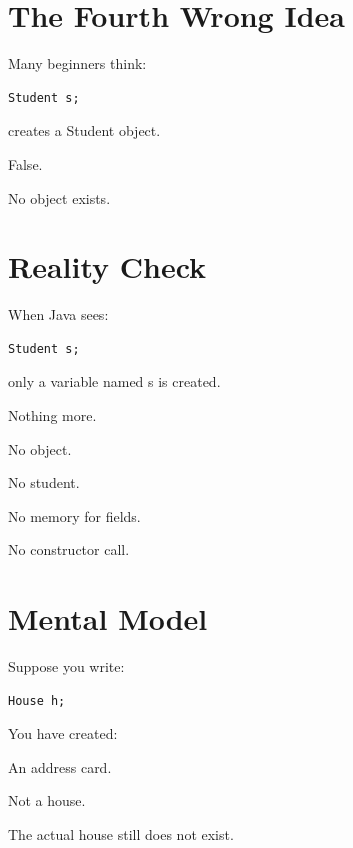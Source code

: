 \documentclass[11pt,a4paper]{book}
\begin{document}

\section{The Fourth Wrong Idea}

\begin{trap}

Many beginners think:

\begin{verbatim}
Student s;
\end{verbatim}

creates a Student object.

False.

No object exists.

\end{trap}


\section{Reality Check}

When Java sees:

\begin{verbatim}
Student s;
\end{verbatim}

only a variable named s is created.

Nothing more.

No object.

No student.

No memory for fields.

No constructor call.


\section{Mental Model}

\begin{mentalmodel}

Suppose you write:

\begin{verbatim}
House h;
\end{verbatim}

You have created:

An address card.

Not a house.

The actual house still does not exist.

\end{mentalmodel}
\end{document}

